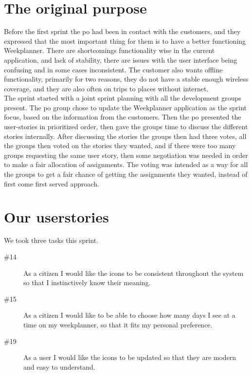 \section{The original purpose}
Before the first sprint the \gls{po} had been in contact with the customers, and they expressed that the most important thing for them is to have a better functioning Weekplanner.
There are shortcomings functionality wise  in the current application, and lack of stability, there are issues with the user interface being confusing and in some cases inconsistent. The customer also wants offline functionality, primarily for two reasons, they do not have a stable enough wireless coverage, and they are also often on trips to places without internet.
\\
The sprint started with a joint sprint planning with all the development groups present. The \gls{po} group chose to update the Weekplanner application as the sprint focus, based on the information from the customers. Then the \gls{po} presented the user-stories in prioritized order, then gave the groups time to discuss the different stories internally. After discussing the stories the groups then had three votes, all the groups then voted on the stories they wanted, and if there were too many groups requesting the same user story, then some negotiation was needed in order to make a fair allocation of assignments. The voting was intended as a way for all the groups to get a fair chance of getting the assignments they wanted, instead of first come first served approach.\newline

\section{Our userstories}
We took three tasks this sprint.
\begin{description}
    \item [\#14] As a citizen I would like the icons to be consistent throughout the system so that I instinctively know their meaning.
    \item [\#15] As a citizen I would like to be able to choose how many days I see at a time on my weekplanner, so that it fits my personal preference.
    \item [\#19] As a user I would like the icons to be updated so that they are modern and easy to understand.
\end{description}

